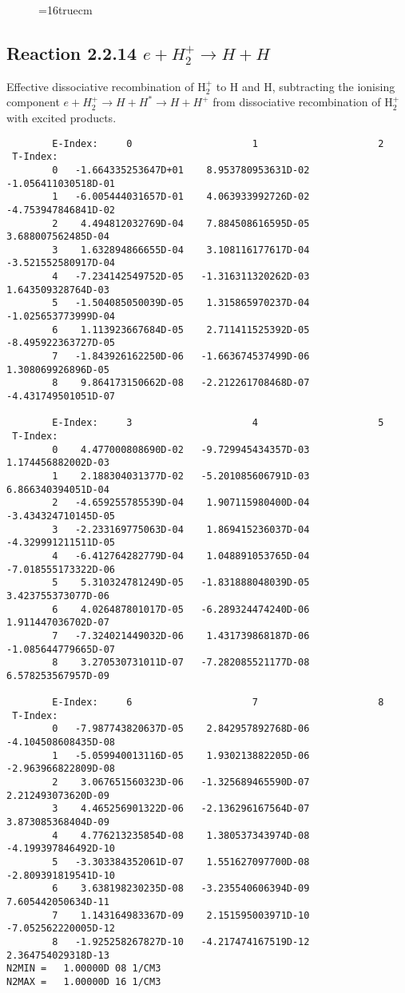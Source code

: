 \documentclass[12pt,dvipdfmx]{article}
\begin{document}
\begin{figure} \label{2.2.12}
\epsfxsize=16truecm
\end{figure}
\newpage



\subsection{
Reaction 2.2.14  $ e + H_2^+    \rightarrow H + H  $
}
Effective dissociative recombination of H$_2^+$ to H and H, subtracting the
ionising component $e+H_2^+ \rightarrow H + H^* \rightarrow H + H^+$ from dissociative recombination of H$_2^+$ with excited products.


\begin{small}\begin{verbatim}
        E-Index:     0                     1                     2
 T-Index:
        0   -1.664335253647D+01    8.953780953631D-02   -1.056411030518D-01
        1   -6.005444031657D-01    4.063933992726D-02   -4.753947846841D-02
        2    4.494812032769D-04    7.884508616595D-05    3.688007562485D-04
        3    1.632894866655D-04    3.108116177617D-04   -3.521552580917D-04
        4   -7.234142549752D-05   -1.316311320262D-03    1.643509328764D-03
        5   -1.504085050039D-05    1.315865970237D-04   -1.025653773999D-04
        6    1.113923667684D-05    2.711411525392D-05   -8.495922363727D-05
        7   -1.843926162250D-06   -1.663674537499D-06    1.308069926896D-05
        8    9.864173150662D-08   -2.212261708468D-07   -4.431749501051D-07

        E-Index:     3                     4                     5
 T-Index:
        0    4.477000808690D-02   -9.729945434357D-03    1.174456882002D-03
        1    2.188304031377D-02   -5.201085606791D-03    6.866340394051D-04
        2   -4.659255785539D-04    1.907115980400D-04   -3.434324710145D-05
        3   -2.233169775063D-04    1.869415236037D-04   -4.329991211511D-05
        4   -6.412764282779D-04    1.048891053765D-04   -7.018555173322D-06
        5    5.310324781249D-05   -1.831888048039D-05    3.423755373077D-06
        6    4.026487801017D-05   -6.289324474240D-06    1.911447036702D-07
        7   -7.324021449032D-06    1.431739868187D-06   -1.085644779665D-07
        8    3.270530731011D-07   -7.282085521177D-08    6.578253567957D-09

        E-Index:     6                     7                     8
 T-Index:
        0   -7.987743820637D-05    2.842957892768D-06   -4.104508608435D-08
        1   -5.059940013116D-05    1.930213882205D-06   -2.963966822809D-08
        2    3.067651560323D-06   -1.325689465590D-07    2.212493073620D-09
        3    4.465256901322D-06   -2.136296167564D-07    3.873085368404D-09
        4    4.776213235854D-08    1.380537343974D-08   -4.199397846492D-10
        5   -3.303384352061D-07    1.551627097700D-08   -2.809391819541D-10
        6    3.638198230235D-08   -3.235540606394D-09    7.605442050634D-11
        7    1.143164983367D-09    2.151595003971D-10   -7.052562220005D-12
        8   -1.925258267827D-10   -4.217474167519D-12    2.364754029318D-13
N2MIN =   1.00000D 08 1/CM3
N2MAX =   1.00000D 16 1/CM3


\end{verbatim}
\end{small}
\end{document}
